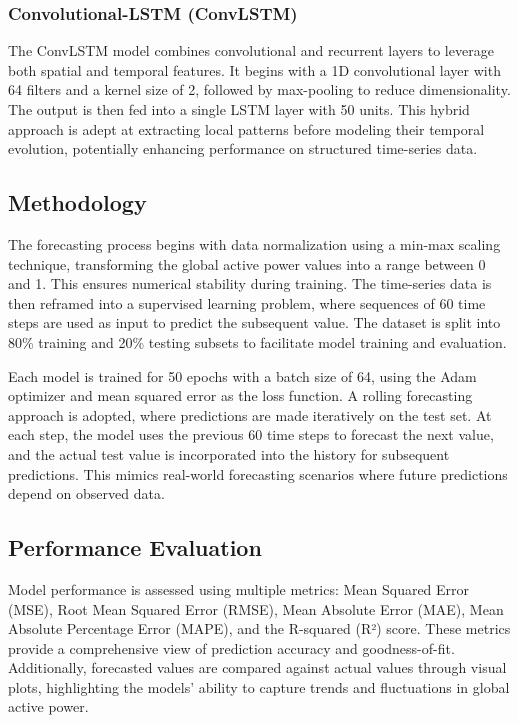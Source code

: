 	\subsubsection{Convolutional-LSTM (ConvLSTM)}
	The ConvLSTM model combines convolutional and recurrent layers to leverage both spatial and temporal features. It begins with a 1D convolutional layer with 64 filters and a kernel size of 2, followed by max-pooling to reduce dimensionality. The output is then fed into a single LSTM layer with 50 units. This hybrid approach is adept at extracting local patterns before modeling their temporal evolution, potentially enhancing performance on structured time-series data.
	
	\subsection{Methodology}
	
	The forecasting process begins with data normalization using a min-max scaling technique, transforming the global active power values into a range between 0 and 1. This ensures numerical stability during training. The time-series data is then reframed into a supervised learning problem, where sequences of 60 time steps are used as input to predict the subsequent value. The dataset is split into 80\% training and 20\% testing subsets to facilitate model training and evaluation.
	
	Each model is trained for 50 epochs with a batch size of 64, using the Adam optimizer and mean squared error as the loss function. A rolling forecasting approach is adopted, where predictions are made iteratively on the test set. At each step, the model uses the previous 60 time steps to forecast the next value, and the actual test value is incorporated into the history for subsequent predictions. This mimics real-world forecasting scenarios where future predictions depend on observed data.
	
	\subsection{Performance Evaluation}
	
	Model performance is assessed using multiple metrics: Mean Squared Error (MSE), Root Mean Squared Error (RMSE), Mean Absolute Error (MAE), Mean Absolute Percentage Error (MAPE), and the R-squared (R²) score. These metrics provide a comprehensive view of prediction accuracy and goodness-of-fit. Additionally, forecasted values are compared against actual values through visual plots, highlighting the models' ability to capture trends and fluctuations in global active power.
	
